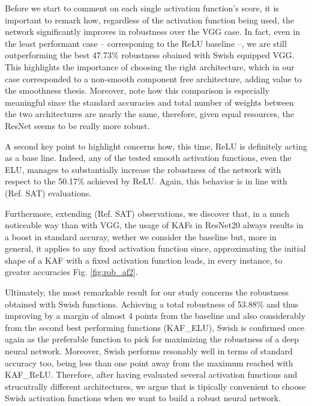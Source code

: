 \documentclass[LaM,binding=0.6cm]{./packages/sapthesis/sapthesis}
\begin{document}
        Before we start to comment on each single activation function's score, it is important to remark how, regardless of the 
        activation function being used, the network significantly improves in robustness over the VGG case. In fact, even in the least 
        performant case -- corresponing to the ReLU baseline --, we are still outperforming the best 47.73\% robustness obained
        with Swish equipped VGG. This highlights the importance of choosing the right architecture, which in our case corresponded to 
        a non-smooth component free architecture, adding value to the smoothness thesis. Moreover, note how this comparison is especially
        meaningful since the standard accuracies and total number of weights between the two architectures are nearly the same, therefore,
        given equal resources, the ResNet seems to be really more robust.

        A second key point to highlight concerns how, this time, ReLU is definitely acting as a base line.
        Indeed, any of the tested smooth activation functions, even the ELU, manages to substantially 
        increase the robustness of the network with respect to the 50.17\% achieved by ReLU. Again, 
        this behavior is in line with (Ref. SAT) evaluations. 
        
        Furthermore, extending (Ref. SAT)
        observations, we discover that, in a much noticeable way than with VGG, the usage of KAFs 
        in ResNet20 always results in a boost in standard accuray, wether we consider the baseline 
        but, more in general, it applies to any fixed activation function since, approximating the  
        initial shape of a KAF with a fixed activation function leads, in every instance, to greater 
        accuracies Fig. \ref{fig:rob_af2}.

        Ultimately, the most remarkable result for our study concerns the robustness obtained 
        with Swish functions. Achieving a total robustness of 53.88\% and thus improving 
        by a margin of almost 4 points from the baseline and also considerably from the second best performing functions (KAF\_ELU), Swish is confirmed once again as the 
        preferable function to pick for maximizing the robustness of a deep neural network. 
        Moreover, Swish performs resonably well in terms of standard accuracy too, being less than one point away 
        from the maximum reached with KAF\_ReLU. Therefore, after having evaluated several activation 
        functions and strucutrally different architectures, we argue that is tipically convenient to 
        choose Swish activation functions when we want to build a robust neural network.
\end{document}
